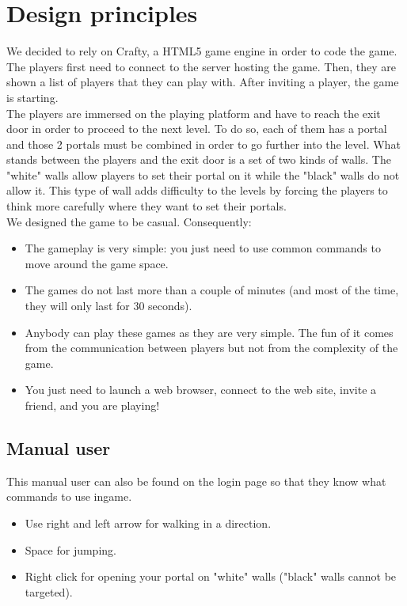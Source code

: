 \documentclass{chi-ext}
\begin{document}
\section{Design principles}
We decided to rely on Crafty, a HTML5 game engine in order to code the game. The players first need to connect to the server hosting the game. Then, they are shown a list of players that they can play with. After inviting a player, the game is starting.\\
The players are immersed on the playing platform and have to reach the exit door in order to proceed to the next level. To do so, each of them has a portal and those 2 portals must be combined in order to go further into the level. What stands between the players and the exit door is a set of two kinds of walls. The "white" walls allow players to set their portal on it while the "black" walls do not allow it. This type of wall adds difficulty to the levels by forcing the players to think more carefully where they want to set their portals.\\
We designed the game to be casual. Consequently:\\
\begin{itemize}
\item The gameplay is very simple: you just need to use common commands to move around the game space.
\item The games do not last more than a couple of minutes (and most of the time, they will only last for 30 seconds).
\item Anybody can play these games as they are very simple. The fun of it comes from the communication between players but not from the complexity of the game.
\item You just need to launch a web browser, connect to the web site, invite a friend, and you are playing!
\end{itemize}

\subsection{Manual user}
This manual user can also be found on the login page so that they know what commands to use ingame.
\begin{itemize}
\item Use right and left arrow for walking in a direction.
\item Space for jumping.
\item Right click for opening your portal on "white" walls ("black" walls cannot be targeted).
\end{itemize}
\end{document}
